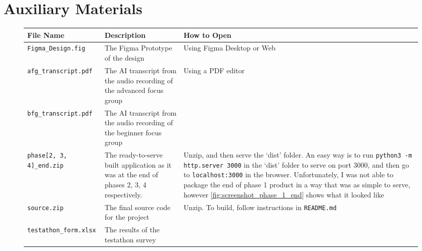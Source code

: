 \chapter{Auxiliary Materials}
\label{appx:additional_mats}
\begin{figure}[h]
    \centering
    \begin{tabular}{|m{4cm}|p{5cm}|>{\raggedright\arraybackslash}p{5.5cm}|}
        \hline\textbf{File Name} & \textbf{Description} & \textbf{How to Open} \\[1ex] \hline\vspace{1ex}
        \verb|Figma_Design.fig| & The Figma Prototype of the design & Using Figma Desktop or Web\\[1ex] \hline\vspace{1ex}
        \verb|afg_transcript.pdf| & The AI transcript from the audio recording of the advanced focus group & Using a PDF editor \\[1ex] \cline{1-2}\vspace{1ex}
        \verb|bfg_transcript.pdf| & The AI transcript from the audio recording of the beginner focus group & \ \\[1ex] \hline\vspace{1ex}

        \verb|phase[2, 3, 4]_end.zip| & The ready-to-serve built application as it was at the end of phases 2, 3, 4 respectively. & Unzip, and then serve the `dist' folder. An easy way is to run \verb|python3 -m http.server 3000| in the `dist' folder to serve on port 3000, and then go to \verb|localhost:3000| in the browser. Unfortunately, I was not able to package the end of phase 1 product in a way that was as simple to serve, however \ref{fig:screenshot_phase_1_end} shows what it looked like\\[1ex]\hline\vspace{1ex}

        \verb|source.zip| & The final source code for the project & Unzip. To build, follow instructions in \verb|README.md| \\[1ex] \hline\vspace{1ex}

        \verb|testathon_form.xlsx| & The results of the testathon survey & \ \\ \hline
    \end{tabular}
\end{figure}
